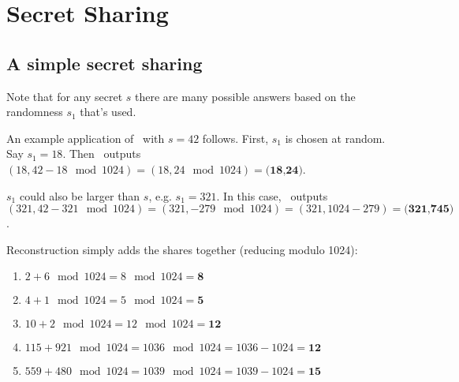 \section{Secret Sharing}

\subsection{A simple secret sharing}
\begin{sampleA}
    Note that for any secret $s$ there are many possible answers based on the 
    randomness $s_1$ that's used. 
    
    An example application of \share~with $s=42$ follows. First, $s_1$ is 
    chosen at random. Say $s_1=18$. Then \share~outputs $(18,42-18 \mod 1024)
    =(18,24 \mod 1024) = \textbf{(18,24)}$.

    $s_1$ could also be larger than $s$, e.g. $s_1 = 321$. In this case, 
    \share~outputs $(321,42-321 \mod 1024)=(321,-279 \mod 1024) = (321,
    1024-279) = \textbf{(321,745)}$.
\end{sampleA}

\begin{answer}
    Reconstruction simply adds the shares together (reducing modulo 1024):
    \renewcommand{\labelenumi}{(\alph{enumi})} 
    \begin{enumerate}
        \item $2+6 \mod 1024 =8 \mod 1024 = \textbf{8}$
        \item $4+1 \mod 1024 =5 \mod 1024 = \textbf{5}$
        \item $10+2 \mod 1024=12 \mod 1024 = \textbf{12}$
        \item $115+921 \mod 1024=1036 \mod 1024=1036-1024=\textbf{12}$
        \item $559+480 \mod 1024=1039 \mod 1024=1039-1024=\textbf{15}$
    \end{enumerate}
\end{answer}

